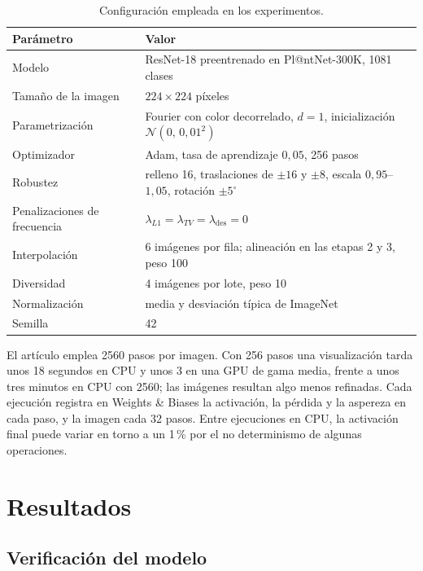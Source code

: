 \documentclass[11pt,a4paper]{article}
\begin{document}
\begin{table}[!htb]
\centering\small
\caption{Configuración empleada en los experimentos.}
\label{tab:config}
\begin{tabular}{L{4.6cm} L{9.2cm}}
\toprule
\textbf{Parámetro} & \textbf{Valor} \\
\midrule
Modelo & ResNet-18 preentrenado en Pl@ntNet-300K, 1081 clases \\
Tamaño de la imagen & $224 \times 224$ píxeles \\
Parametrización & Fourier con color decorrelado, $d = 1$, inicialización $\mathcal{N}(0,\, 0{,}01^2)$ \\
Optimizador & Adam, tasa de aprendizaje $0{,}05$, 256 pasos \\
Robustez & relleno 16, traslaciones de $\pm16$ y $\pm8$, escala $0{,}95$--$1{,}05$, rotación $\pm5^\circ$ \\
Penalizaciones de frecuencia & $\lambda_{L1} = \lambda_{TV} = \lambda_{\text{des}} = 0$ \\
Interpolación & 6 imágenes por fila; alineación en las etapas 2 y 3, peso 100 \\
Diversidad & 4 imágenes por lote, peso 10 \\
Normalización & media y desviación típica de ImageNet \\
Semilla & 42 \\
\bottomrule
\end{tabular}
\end{table}

El artículo emplea 2560 pasos por imagen. Con 256 pasos una visualización
tarda unos 18 segundos en CPU y unos 3 en una GPU de gama media, frente a
unos tres minutos en CPU con 2560; las imágenes resultan algo menos
refinadas. Cada ejecución registra en Weights \& Biases la activación, la
pérdida y la aspereza en cada paso, y la imagen cada 32 pasos. Entre
ejecuciones en CPU, la activación final puede variar en torno a un 1\,\%
por el no determinismo de algunas operaciones.

\section{Resultados}
\label{sec:resultados}

\subsection{Verificación del modelo}
\label{sec:verificacion}
\end{document}
